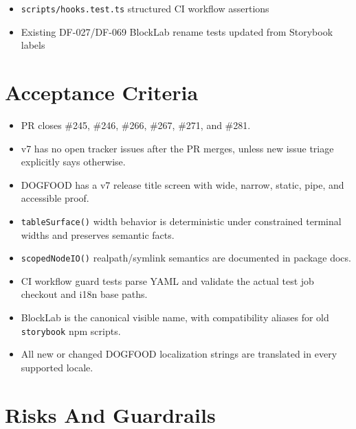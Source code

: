 \begin{itemize}
\item
  \texttt{s\allowbreak{}c\allowbreak{}r\allowbreak{}i\allowbreak{}p\allowbreak{}t\allowbreak{}s\allowbreak{}/\allowbreak{}h\allowbreak{}o\allowbreak{}o\allowbreak{}k\allowbreak{}s\allowbreak{}.\allowbreak{}t\allowbreak{}e\allowbreak{}s\allowbreak{}t\allowbreak{}.\allowbreak{}t\allowbreak{}s} structured CI workflow assertions
\item
  Existing DF-027/DF-069 BlockLab rename tests updated from Storybook labels
\end{itemize}

\section{Acceptance Criteria}\label{record-101-acceptance-criteria}

\begin{itemize}
\tightlist
\item
  PR closes \#245, \#246, \#266, \#267, \#271, and \#281.
\item
  v7 has no open tracker issues after the PR merges, unless new issue triage explicitly says otherwise.
\item
  DOGFOOD has a v7 release title screen with wide, narrow, static, pipe, and accessible proof.
\item
  \texttt{t\allowbreak{}a\allowbreak{}b\allowbreak{}l\allowbreak{}e\allowbreak{}S\allowbreak{}u\allowbreak{}r\allowbreak{}f\allowbreak{}a\allowbreak{}c\allowbreak{}e\allowbreak{}(\allowbreak{})} width behavior is deterministic under constrained terminal widths and preserves semantic facts.
\item
  \texttt{s\allowbreak{}c\allowbreak{}o\allowbreak{}p\allowbreak{}e\allowbreak{}d\allowbreak{}N\allowbreak{}o\allowbreak{}d\allowbreak{}e\allowbreak{}I\allowbreak{}O\allowbreak{}(\allowbreak{})} realpath/symlink semantics are documented in package docs.
\item
  CI workflow guard tests parse YAML and validate the actual test job checkout and i18n base paths.
\item
  BlockLab is the canonical visible name, with compatibility aliases for old \texttt{s\allowbreak{}t\allowbreak{}o\allowbreak{}r\allowbreak{}y\allowbreak{}b\allowbreak{}o\allowbreak{}o\allowbreak{}k} npm scripts.
\item
  All new or changed DOGFOOD localization strings are translated in every supported locale.
\end{itemize}

\section{Risks And Guardrails}\label{record-101-risks-and-guardrails}

